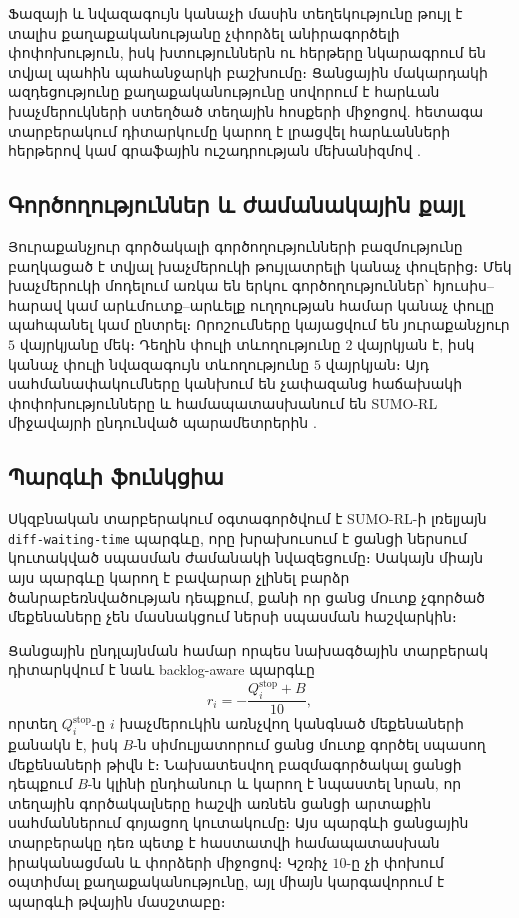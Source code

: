 \documentclass[12pt,a4paper]{extreport}
\begin{document}
Ֆազայի և նվազագույն կանաչի մասին տեղեկությունը թույլ է տալիս քաղաքականությանը չփորձել անիրագործելի փոփոխություն, իսկ խտություններն ու հերթերը նկարագրում են տվյալ պահին պահանջարկի բաշխումը։ Ցանցային մակարդակի ազդեցությունը քաղաքականությունը սովորում է հարևան խաչմերուկների ստեղծած տեղային հոսքերի միջոցով. հետագա տարբերակում դիտարկումը կարող է լրացվել հարևանների հերթերով կամ գրաֆային ուշադրության մեխանիզմով \cite{colight2019}.

\subsection{Գործողություններ և ժամանակային քայլ}

Յուրաքանչյուր գործակալի գործողությունների բազմությունը բաղկացած է տվյալ խաչմերուկի թույլատրելի կանաչ փուլերից։ Մեկ խաչմերուկի մոդելում առկա են երկու գործողություններ՝ հյուսիս--հարավ կամ արևմուտք--արևելք ուղղության համար կանաչ փուլը պահպանել կամ ընտրել։ Որոշումները կայացվում են յուրաքանչյուր $5$ վայրկյանը մեկ։ Դեղին փուլի տևողությունը $2$ վայրկյան է, իսկ կանաչ փուլի նվազագույն տևողությունը $5$ վայրկյան։ Այդ սահմանափակումները կանխում են չափազանց հաճախակի փոփոխությունները և համապատասխանում են SUMO-RL միջավայրի ընդունված պարամետրերին \cite{sumorl}.

\subsection{Պարգևի ֆունկցիա}

Սկզբնական տարբերակում օգտագործվում է SUMO-RL-ի լռելյայն \texttt{diff-waiting-time} պարգևը, որը խրախուսում է ցանցի ներսում կուտակված սպասման ժամանակի նվազեցումը։ Սակայն միայն այս պարգևը կարող է բավարար չլինել բարձր ծանրաբեռնվածության դեպքում, քանի որ ցանց մուտք չգործած մեքենաները չեն մասնակցում ներսի սպասման հաշվարկին։

Ցանցային ընդլայնման համար որպես նախագծային տարբերակ դիտարկվում է նաև backlog-aware պարգևը
\begin{equation}
  r_i = -\frac{Q_i^{\mathrm{stop}} + B}{10},
\end{equation}
որտեղ $Q_i^{\mathrm{stop}}$-ը $i$ խաչմերուկին առնչվող կանգնած մեքենաների քանակն է, իսկ $B$-ն սիմուլյատորում ցանց մուտք գործել սպասող մեքենաների թիվն է։ Նախատեսվող բազմագործակալ ցանցի դեպքում $B$-ն կլինի ընդհանուր և կարող է նպաստել նրան, որ տեղային գործակալները հաշվի առնեն ցանցի արտաքին սահմաններում գոյացող կուտակումը։ Այս պարգևի ցանցային տարբերակը դեռ պետք է հաստատվի համապատասխան իրականացման և փորձերի միջոցով։ Կշռիչ $10$-ը չի փոխում օպտիմալ քաղաքականությունը, այլ միայն կարգավորում է պարգևի թվային մասշտաբը։
\end{document}
